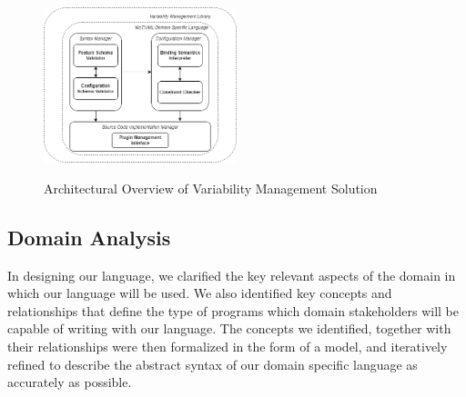\documentclass[conference]{IEEEtran}
\begin{document}
\begin{figure}[H]
\caption{Architectural Overview of Variability Management Solution}
\centering
\includegraphics[width=0.5\textwidth]{diagrams/arch-overview.png}
\label{arch-over}
\end{figure}

\subsection{Domain Analysis}
In designing our language, we clarified the key relevant aspects of the domain in which our language will be used. We also identified key concepts and relationships that define the type of programs which domain stakeholders will be capable of writing with our language. The concepts we identified, together with their relationships were then formalized in the form of a model, and iteratively refined to describe the abstract syntax of our domain specific language as accurately as possible. 
\end{document}
